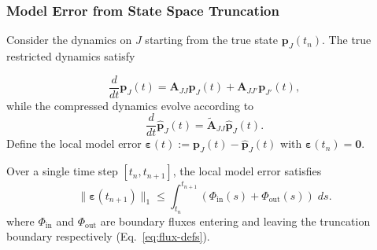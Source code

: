 \documentclass[onefignum,onetabnum]{siamart171218}
\begin{document}
\subsubsection{Model Error from State Space Truncation}

Consider the dynamics on $J$ starting from the true state $\boldsymbol{p}_J(t_n)$. The true restricted dynamics satisfy

\begin{equation}
\label{eq:true-restricted}
\frac{d}{dt} \boldsymbol{p}_J(t) = \mathbf{A}_{JJ}\boldsymbol{p}_J(t) + \mathbf{A}_{JJ'}\boldsymbol{p}_{J'}(t),
\end{equation}
while the compressed dynamics evolve according to
\begin{equation}
\label{eq:compressed-dynamics-exact}
\frac{d}{dt} \widehat{\boldsymbol{p}}_J(t) = \widetilde{\mathbf{A}}_{JJ}\widehat{\boldsymbol{p}}_J(t).
\end{equation}
Define the local model error $\boldsymbol{\varepsilon}(t) := \boldsymbol{p}_J(t) - \widehat{\boldsymbol{p}}_J(t)$ with $\boldsymbol{\varepsilon}(t_n) = \mathbf{0}$.

\begin{theorem}
\label{thm:local-model-error}
Over a single time step $[t_n, t_{n+1}]$, the local model error satisfies
\begin{equation}
\|\boldsymbol{\varepsilon}(t_{n+1})\|_1 \leq \int_{t_n}^{t_{n+1}} (\Phi_{\mathrm{in}}(s) + \Phi_{\mathrm{out}}(s)) \; ds.
\end{equation}
where $\Phi_{\mathrm{in}}$ and $\Phi_{\mathrm{out}}$ are boundary fluxes entering and leaving the truncation boundary respectively (Eq.~\eqref{eq:flux-defs}).
\end{theorem}
\end{document}
